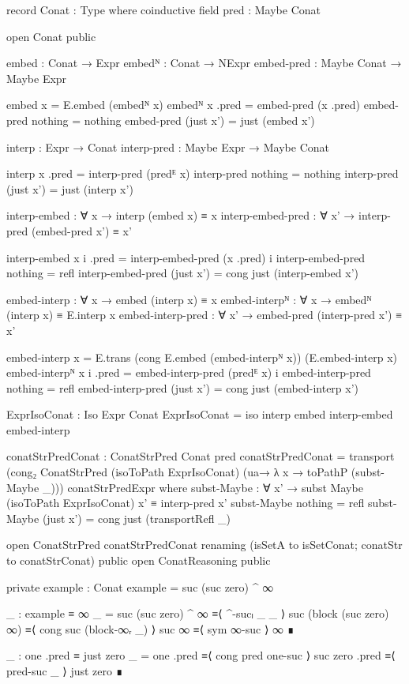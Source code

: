\begin{code}[hide]
record Conat : Type where
  coinductive
  field pred : Maybe Conat

open Conat public

embed : Conat → Expr
embedᴺ : Conat → NExpr
embed-pred : Maybe Conat → Maybe Expr

embed x = E.embed (embedᴺ x)
embedᴺ x .pred = embed-pred (x .pred)
embed-pred nothing = nothing
embed-pred (just x') = just (embed x')

interp : Expr → Conat
interp-pred : Maybe Expr → Maybe Conat

interp x .pred = interp-pred (predᴱ x)
interp-pred nothing = nothing
interp-pred (just x') = just (interp x')

interp-embed : ∀ x → interp (embed x) ≡ x
interp-embed-pred : ∀ x' → interp-pred (embed-pred x') ≡ x'

interp-embed x i .pred = interp-embed-pred (x .pred) i
interp-embed-pred nothing = refl
interp-embed-pred (just x') = cong just (interp-embed x')

embed-interp : ∀ x → embed (interp x) ≡ x
embed-interpᴺ : ∀ x → embedᴺ (interp x) ≡ E.interp x
embed-interp-pred : ∀ x' → embed-pred (interp-pred x') ≡ x'

embed-interp x = E.trans (cong E.embed (embed-interpᴺ x)) (E.embed-interp x)
embed-interpᴺ x i .pred = embed-interp-pred (predᴱ x) i
embed-interp-pred nothing = refl
embed-interp-pred (just x') = cong just (embed-interp x')

ExprIsoConat : Iso Expr Conat
ExprIsoConat = iso interp embed interp-embed embed-interp

conatStrPredConat : ConatStrPred Conat pred
conatStrPredConat =
  transport
    (cong₂ ConatStrPred
      (isoToPath ExprIsoConat)
      (ua→ λ x → toPathP (subst-Maybe _)))
    conatStrPredExpr
  where
  subst-Maybe :
    ∀ x' → subst Maybe (isoToPath ExprIsoConat) x' ≡ interp-pred x'
  subst-Maybe nothing = refl
  subst-Maybe (just x') = cong just (transportRefl _)

open ConatStrPred conatStrPredConat
  renaming (isSetA to isSetConat; conatStr to conatStrConat) public
open ConatReasoning public

private
  example : Conat
  example = suc (suc zero) ^ ∞

  _ : example ≡ ∞
  _ =
    suc (suc zero) ^ ∞       ≡⟨ ^-sucₗ _ _ ⟩
    suc (block (suc zero) ∞) ≡⟨ cong suc (block-∞ᵣ _) ⟩
    suc ∞                    ≡⟨ sym ∞-suc ⟩
    ∞                        ∎

  _ : one .pred ≡ just zero
  _ =
    one .pred      ≡⟨ cong pred one-suc ⟩
    suc zero .pred ≡⟨ pred-suc _ ⟩
    just zero      ∎
\end{code}
